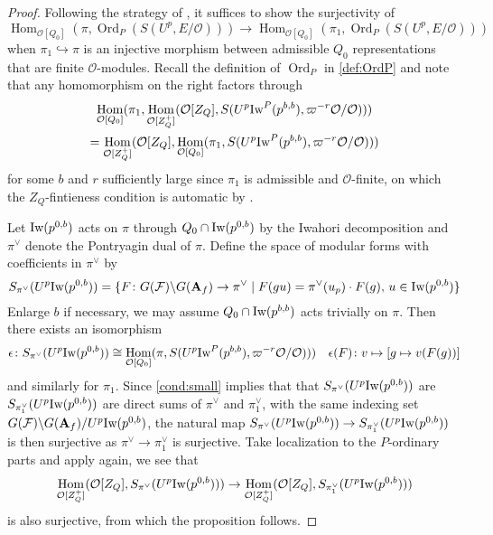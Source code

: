 \documentclass[leqno]{amsart}
\theoremstyle{definition}
\theoremstyle{remark}
\newcommand{\oo}{\mathcal{O}}
\newcommand{\A}{\mathbf A}
\DeclareMathOperator{\Hom}{Hom}
\DeclareMathOperator{\Ord}{Ord} %
\newcommand{\F}{{\mathcal{F}}} %
\newcommand{\Iw}{\textnormal{Iw}} %
\begin{document}
\begin{proof}
	Following the strategy of 
	\cite[Prop 3.2.4]{pan}, 
	it suffices to show the surjectivity of
	\[
		\Hom_{\oo[Q_0]}(\pi,\Ord_P(S(U^p,E/\oo)))\to 
		\Hom_{\oo[Q_0]}(\pi_1,\Ord_P(S(U^p,E/\oo)))
	\]
	when $\pi_{1}\hookrightarrow \pi$ 
	is an injective morphism between admissible $Q_0$
	representations that are finite $\oo$-modules.
    Recall the definition of $\Ord_P$ in \eqref{def:OrdP}
    and note that
	any homomorphism on the right factors through 
	\begin{multline*}
		\Hom_{\oo[Q_0]}(\pi_1,
		\Hom_{\oo[Z_Q^+]}
		(\oo[Z_Q], S(U^p\Iw^P(p^{b,b}),
		\varpi^{-r}\oo/\oo)))\\=
		\Hom_{\oo[Z_Q^+]}(\oo[Z_Q],
		\Hom_{\oo[Q_0]}(\pi_1, 
		S(U^p\Iw^P(p^{b,b}),\varpi^{-r}\oo/\oo)))
	\end{multline*}
	for some $b$ and $r$ sufficiently large
    since $\pi_1$ is admissible and $\oo$-finite,
	on which 
	the $Z_Q$-fintieness condition is automatic
	by \cite[Lem 3.1.5]{emeI}.

    Let $\Iw(p^{0,b})$ 
    acts on $\pi$ through $Q_0\cap \Iw(p^{0,b})$
    by the Iwahori decomposition
    and $\pi^\vee$ denote the Pontryagin dual of $\pi$.
	Define the space of modular forms with
    coefficients in $\pi^\vee$ by
	\[
		S_{\pi^\vee}(U^p\Iw(p^{0,b}))=
		\{
			F\colon G(\F)\backslash G(\A_f)\to 
			\pi^\vee\mid 
			F(gu)=\pi^\vee(u_p)\cdot F(g),\,
			u\in \Iw(p^{0,b})
		\}
	\]
	Enlarge $b$ if necessary, we may assume
	$Q_0\cap \Iw(p^{b,b})$ acts trivially on $\pi$.
	Then there exists an isomorphism
	\[
		\epsilon\colon 
		S_{\pi^\vee}(U^p\Iw(p^{0,b}))\cong 
		\Hom_{\oo[Q_0]}(\pi,
		S(U^p\Iw^P(p^{b,b}),\varpi^{-r}\oo/\oo)))
		\quad \epsilon(F)\colon
		v\mapsto [g\mapsto v(F(g))]
	\]
	and similarly for $\pi_1$.
    Since \ref{cond:small} implies that
	that $S_{\pi^\vee}(U^p\Iw(p^{0,b}))$
	are $S_{\pi_1^\vee}(U^p\Iw(p^{0,b}))$
	are direct sums of 
	$\pi^\vee$ and  $\pi_1^\vee$, 
    with the same indexing set
	$G(\F)\backslash G(\A_f)/U^p\Iw(p^{0,b})$,
    the natural map
	$S_{\pi^\vee}(U^p\Iw(p^{0,b}))\to 
	S_{\pi_1^\vee}(U^p\Iw(p^{0,b}))$ is then
	surjective
	as $\pi^\vee\to \pi_1^\vee$ is surjective.
	Take localization to the $P$-ordinary parts
	and apply \cite[Lem 3.1.5]{emeI} again,
	we see that
	\[
		\Hom_{\oo[Z_Q^+]}(\oo[Z_Q],
		S_{\pi^\vee}(U^p\Iw(p^{0,b})))\to 
		\Hom_{\oo[Z_Q^+]}(\oo[Z_Q],
		S_{\pi^\vee_1}(U^p\Iw(p^{0,b})))
	\]
	is also surjective, from which 
	the proposition follows.
\end{proof}
\end{document}
